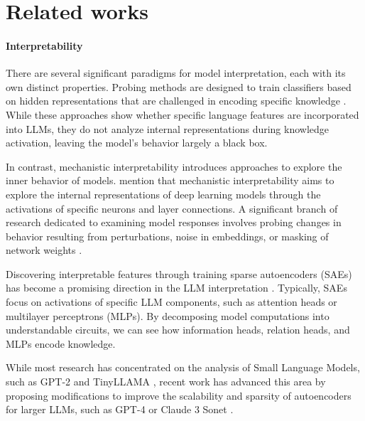 \section{Related works}
\paragraph{Interpretability} There are several significant paradigms for model interpretation, each with its own distinct properties. Probing methods are designed to train classifiers based on hidden representations that are challenged in encoding specific knowledge \cite{ettinger-etal-2016-probing,belinkov-etal-2017-neural,conneau-etal-2018-cram,belinkov2022probing}. While these approaches show whether specific language features are incorporated into LLMs, they do not analyze internal representations during knowledge activation, leaving the model's behavior largely a black box.

In contrast, mechanistic interpretability introduces approaches to explore the inner behavior of models.  \citet{calderon2024behalf} mention that mechanistic interpretability aims to explore the internal representations of deep learning models through the activations of specific neurons and layer connections. A significant branch of research dedicated to examining model responses involves probing changes in behavior resulting from perturbations, noise in embeddings, or masking of network weights \cite{dai-etal-2022-knowledge,meng2022locating,olsson2022context,wang2022interpretabilitywildcircuitindirect,conmy2023}. 

Discovering interpretable features through training sparse autoencoders (SAEs) has become a promising direction in the LLM interpretation \cite{cunningham2023sparseautoencodershighlyinterpretable,yu-etal-2023-characterizing}. Typically, SAEs focus on activations of specific LLM components, such as attention heads or multilayer perceptrons (MLPs). By decomposing model computations into understandable circuits, we can see how information heads, relation heads, and MLPs encode knowledge\cite{yao2024knowledgecircuitspretrainedtransformers}.


While most research has concentrated on the analysis of Small Language Models, such as GPT-2 \cite{radford2019language} and TinyLLAMA \cite{zhang2024tinyllama}, recent work has advanced this area by proposing modifications to improve the scalability and sparsity of autoencoders for larger LLMs, such as GPT-4 or Claude 3 Sonet \cite{gao2024,templeton2024scaling}.

